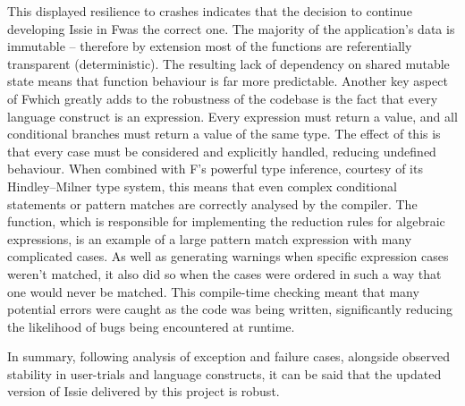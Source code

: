 This displayed resilience to crashes indicates that the decision to continue developing Issie in F\fsharp was the correct one. The majority of the application's data is immutable -- therefore by extension most of the functions are referentially transparent (deterministic). The resulting lack of dependency on shared mutable state means that function behaviour is far more predictable. Another key aspect of F\fsharp which greatly adds to the robustness of the codebase is the fact that every language construct is an expression. Every expression must return a value, and all conditional branches must return a value of the same type. The effect of this is that every case must be considered and explicitly handled, reducing undefined behaviour. When combined with F\fsharp's powerful type inference, courtesy of its Hindley–Milner type system, this means that even complex conditional statements or pattern matches are correctly analysed by the compiler. The  function, which is responsible for implementing the reduction rules for algebraic expressions, is an example of a large pattern match expression with many complicated cases. As well as generating warnings when specific expression cases weren't matched, it also did so when the cases were ordered in such a way that one would never be matched. This compile-time checking meant that many potential errors were caught as the code was being written, significantly reducing the likelihood of bugs being encountered at runtime.

In summary, following analysis of exception and failure cases, alongside observed stability in user-trials and language constructs, it can be said that the updated version of Issie delivered by this project is robust.
